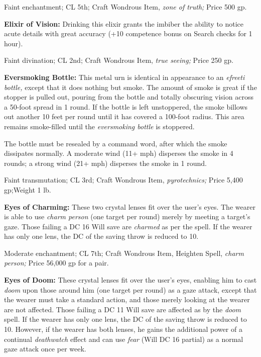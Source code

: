 \documentclass{article}
\begin{document}
Faint enchantment; CL 5th; Craft Wondrous Item, \textit{zone of truth; }Price 500 
gp.

\textbf{Elixir of Vision:} Drinking this elixir grants the imbiber the ability 
to notice acute details with great accuracy (+10 competence bonus on Search checks 
for 1 hour).

Faint divination; CL 2nd; Craft Wondrous Item, \textit{true seeing; }Price 250 
gp.

\textbf{Eversmoking Bottle:} This metal urn is identical in appearance to an \textit{efreeti 
bottle, }except that it does nothing but smoke. The amount of smoke is great if 
the stopper is pulled out, pouring from the bottle and totally obscuring vision 
across a 50-foot spread in 1 round. If the bottle is left unstoppered, the smoke 
billows out another 10 feet per round until it has covered a 100-foot radius. This 
area remains smoke-filled until the \textit{eversmoking bottle }is stoppered.

The bottle must be resealed by a command word, after which the smoke dissipates 
normally. A moderate wind (11+ mph) disperses the smoke in 4 rounds; a strong wind 
(21+ mph) disperses the smoke in 1 round.

Faint transmutation; CL 3rd; Craft Wondrous Item, \textit{pyrotechnics; }Price 
5,400 gp;Weight 1 lb.

\textbf{Eyes of Charming: }These two crystal lenses fit over the user's eyes. The 
wearer is able to use \textit{charm person }(one target per round) merely by meeting 
a target's gaze. Those failing a DC 16 Will save are \textit{charmed }as per the 
spell. If the wearer has only one lens, the DC of the saving throw is reduced to 
10.

Moderate enchantment; CL 7th; Craft Wondrous Item, Heighten Spell, \textit{charm 
person; }Price 56,000 gp for a pair.

\textbf{Eyes of Doom:} These crystal lenses fit over the user's eyes, enabling 
him to cast \textit{doom }upon those around him (one target per round) as a gaze 
attack, except that the wearer must take a standard action, and those merely looking 
at the wearer are not affected. Those failing a DC 11 Will save are affected as 
by the \textit{doom }spell. If the wearer has only one lens, the DC of the saving 
throw is reduced to 10. However, if the wearer has both lenses, he gains the additional 
power of a continual \textit{deathwatch }effect and can use \textit{fear }(Will 
DC 16 partial) as a normal gaze attack once per week.
\end{document}
